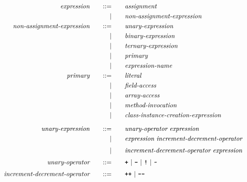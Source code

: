 \begin{alignat*}{9}
&& \textit{expression}                           && \quad ::= & \quad && \textit{assignment} && \\
&&                                               &&         | & \quad && \textit{non-assignment-expression} && \\
&& \textit{non-assignment-expression}                           && \quad ::= & \quad && \textit{unary-expression} && \\
&&                                               &&         | & \quad && \textit{binary-expression} && \\
&&                                               &&         | & \quad && \textit{ternary-expression} && \\
&&                                               &&         | & \quad && \textit{primary} && \\
&&                                               &&         | & \quad && \textit{expression-name} && \\
&& \textit{primary}                           && \quad ::= & \quad && \textit{literal} && \\
&&                                               &&         | & \quad && \textit{field-access} && \\
&&                                               &&         | & \quad && \textit{array-access} && \\
&&                                               &&         | & \quad && \textit{method-invocation} && \\
&&                                              &&         | & \quad && \textit{class-instance-creation-expression} && \\[2mm]
&& \textit{unary-expression}                     && \quad ::= & \quad && \textit{unary-operator} \ \textit{expression} && \\
&&                                               &&         | & \quad && \textit{expression} \ \textit{increment-decrement-operator} && \\[1mm]
&&                                               &&         | & \quad && \textit{increment-decrement-operator} \ \textit{expression} && \\[1mm]
&& \textit{unary-operator}                       && \quad ::= & \quad && \textbf{\texttt{+}} \ | \ \textbf{\texttt{-}} \ | \ \textbf{\texttt{!}} \ | \ \textbf{\texttt{\textasciitilde}} && \\[1mm]
&& \textit{increment-decrement-operator}                      && \quad ::= & \quad && \textbf{\texttt{++}} \ | \ \textbf{\texttt{-}}\textbf{\texttt{-}} && \\[1mm]

\end{alignat*}
